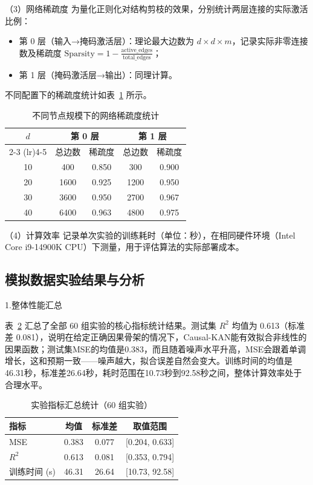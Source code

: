 （3）网络稀疏度
为量化正则化对结构剪枝的效果，分别统计两层连接的实际激活比例：
\begin{itemize}
	\item 第 0 层（输入→掩码激活层）：理论最大边数为 $d \times d \times m$，记录实际非零连接数及稀疏度 $\text{Sparsity} = 1 - \frac{\text{active\_edges}}{\text{total\_edges}}$；
	\item 第 1 层（掩码激活层→输出）：同理计算。
\end{itemize}
不同配置下的稀疏度统计如表~\ref{tab:sparsity} 所示。

\begin{table}[htbp]
	\centering
	\caption{不同节点规模下的网络稀疏度统计}{\label{tab:sparsity}}
	\begin{tabular}{ccccc}
		\toprule
		\multirow{2}{*}{$d$} & \multicolumn{2}{c}{第 0 层} & \multicolumn{2}{c}{第 1 层} \\
		\cmidrule(lr){2-3} \cmidrule(lr){4-5}
		& 总边数 & 稀疏度 & 总边数 & 稀疏度 \\
		\midrule
		10 & 400  & 0.850 & 300  & 0.900 \\
		20 & 1600 & 0.925 & 1200 & 0.950 \\
		30 & 3600 & 0.950 & 2700 & 0.967 \\
		40 & 6400 & 0.963 & 4800 & 0.975 \\
		\bottomrule
	\end{tabular}
\end{table}


（4）计算效率
记录单次实验的训练耗时（单位：秒），在相同硬件环境（Intel Core i9-14900K CPU）下测量，用于评估算法的实际部署成本。

\subsection{模拟数据实验结果与分析}{\label{subsec:simu_results}}

{\hei 1.整体性能汇总}{\label{subsubsec:overall_summary}}

表~\ref{tab:summary_stats} 汇总了全部 60 组实验的核心指标统计结果。测试集 $R^2$ 均值为 0.613（标准差 0.081），说明在给定正确因果骨架的情况下，Causal-KAN能有效拟合非线性的因果函数；测试集MSE的均值是0.383，而且随着噪声水平升高，MSE会跟着单调增长，这和预期一致——噪声越大，拟合误差自然会变大。训练时间的均值是46.31秒，标准差26.64秒，耗时范围在10.73秒到92.58秒之间，整体计算效率处于合理水平。

\begin{table}[htbp]
	\centering
	\caption{实验指标汇总统计（60 组实验）}{\label{tab:summary_stats}}
	\begin{tabular}{lccc}
		\toprule
		指标 & 均值 & 标准差 & 取值范围 \\
		\midrule
		MSE  & 0.383 & 0.077 & [0.204, 0.633] \\
		$R^2$ & 0.613 & 0.081 & [0.353, 0.794] \\
		训练时间 (s) & 46.31 & 26.64 & [10.73, 92.58] \\
		\bottomrule
	\end{tabular}
\end{table}

